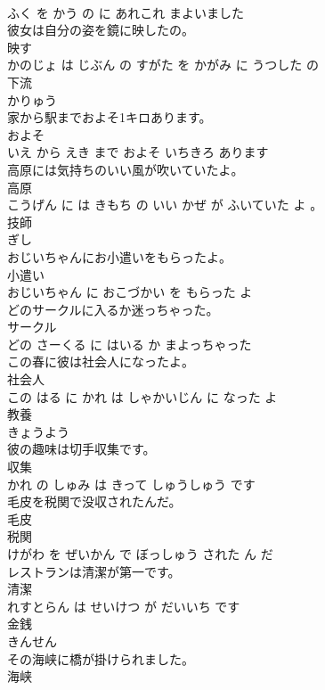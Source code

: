 \documentclass[8pt]{extreport}
\begin{document}
\begin{CJK}{UTF8}{min}
\\	ふく を かう の に あれこれ まよいました			
\\	彼女は自分の姿を鏡に映したの。	
\\	映す 
\\	かのじょ は じぶん の すがた を かがみ に うつした の			
\\	下流	
\\	かりゅう			
\\	家から駅までおよそ1キロあります。	
\\	およそ 
\\	いえ から えき まで およそ いちきろ あります			
\\	高原には気持ちのいい風が吹いていたよ。	
\\	高原 
\\	こうげん に は きもち の いい かぜ が ふいていた よ 。			
\\	技師	
\\	ぎし			
\\	おじいちゃんにお小遣いをもらったよ。	
\\	小遣い 
\\	おじいちゃん に おこづかい を もらった よ			
\\	どのサークルに入るか迷っちゃった。	
\\	サークル 
\\	どの さーくる に はいる か まよっちゃった			
\\	この春に彼は社会人になったよ。	
\\	社会人 
\\	この はる に かれ は しゃかいじん に なった よ			
\\	教養	
\\	きょうよう			
\\	彼の趣味は切手収集です。	
\\	収集 
\\	かれ の しゅみ は きって しゅうしゅう です			
\\	毛皮を税関で没収されたんだ。	
\\	毛皮 
\\	税関 
\\	けがわ を ぜいかん で ぼっしゅう された ん だ			
\\	レストランは清潔が第一です。	
\\	清潔 
\\	れすとらん は せいけつ が だいいち です			
\\	金銭	
\\	きんせん			
\\	その海峡に橋が掛けられました。	
\\	海峡 

\end{CJK}
\end{document}

